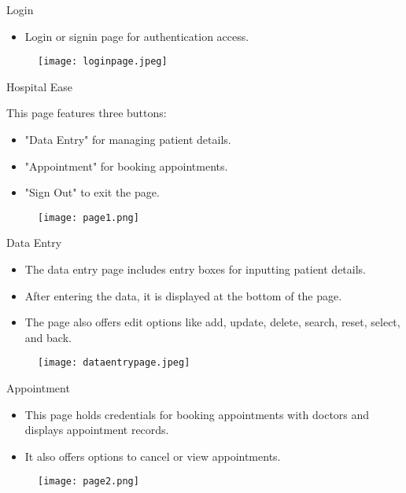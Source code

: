 \documentclass{beamer}
\begin{document}
\begin{frame}{Login}
  \begin{itemize}
    \item Login or signin page for authentication access.
  \end{itemize}
  \begin{figure}
    \centering
    \texttt{[image: loginpage.jpeg]} 
\end{figure}
\end{frame}


\begin{frame}{Hospital Ease}
\item This page features three buttons:
\begin{itemize}
 \item"Data Entry" for managing patient details. \item"Appointment" for booking appointments.
 \item"Sign Out" to exit the page.
 \end{itemize}
\begin{figure}
    \centering
    \texttt{[image: page1.png]} 
\end{figure}
\end{frame}


\begin{frame}{Data Entry}
  \begin{itemize}
    \item The data entry page includes entry boxes for inputting patient details.
    \item After entering the data, it is displayed at the bottom of the page. 
    \item The page also offers edit options like add, update, delete, search, reset, select, and back.
   
  \end{itemize}
  \begin{figure}
    \centering
    \texttt{[image: dataentrypage.jpeg]}
\end{figure}
\end{frame}



\begin{frame}{Appointment}
\begin{itemize}
 \item This page holds credentials for booking appointments with doctors and displays appointment records.  
 \vspace*{2mm}
 \item It also offers options to cancel or view appointments.
 \end{itemize}
\begin{figure}
    \centering
    \texttt{[image: page2.png]} 
\end{figure}
\end{frame}
\end{document}

